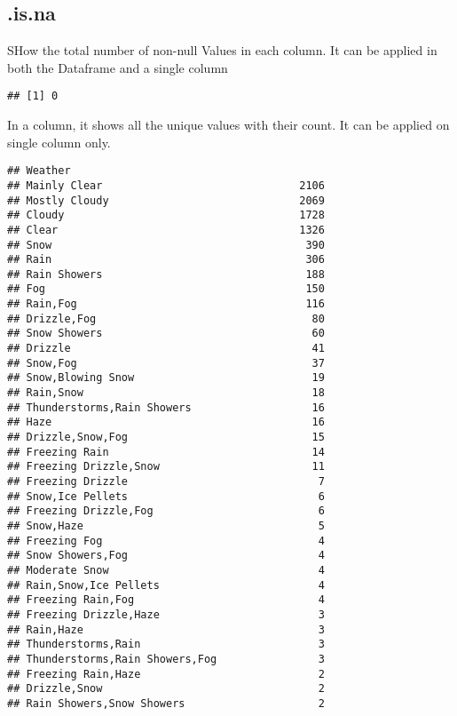 \documentclass[
]{article}
\begin{document}
\hypertarget{is.na}{%
\subsection{.is.na}\label{is.na}}

SHow the total number of non-null Values in each column. It can be
applied in both the Dataframe and a single column

\begin{verbatim}
## [1] 0
\end{verbatim}

In a column, it shows all the unique values with their count. It can be
applied on single column only.

\begin{verbatim}
## Weather
## Mainly Clear                               2106
## Mostly Cloudy                              2069
## Cloudy                                     1728
## Clear                                      1326
## Snow                                        390
## Rain                                        306
## Rain Showers                                188
## Fog                                         150
## Rain,Fog                                    116
## Drizzle,Fog                                  80
## Snow Showers                                 60
## Drizzle                                      41
## Snow,Fog                                     37
## Snow,Blowing Snow                            19
## Rain,Snow                                    18
## Thunderstorms,Rain Showers                   16
## Haze                                         16
## Drizzle,Snow,Fog                             15
## Freezing Rain                                14
## Freezing Drizzle,Snow                        11
## Freezing Drizzle                              7
## Snow,Ice Pellets                              6
## Freezing Drizzle,Fog                          6
## Snow,Haze                                     5
## Freezing Fog                                  4
## Snow Showers,Fog                              4
## Moderate Snow                                 4
## Rain,Snow,Ice Pellets                         4
## Freezing Rain,Fog                             4
## Freezing Drizzle,Haze                         3
## Rain,Haze                                     3
## Thunderstorms,Rain                            3
## Thunderstorms,Rain Showers,Fog                3
## Freezing Rain,Haze                            2
## Drizzle,Snow                                  2
## Rain Showers,Snow Showers                     2

\end{verbatim}
\end{document}
